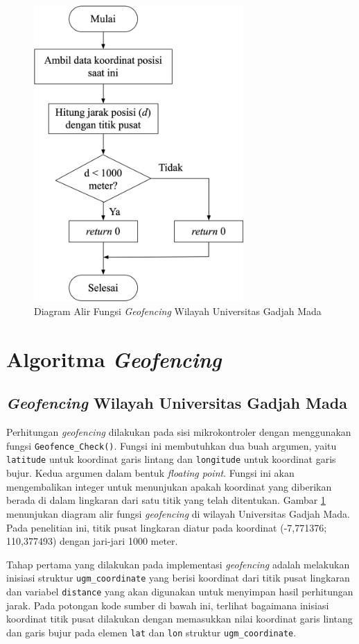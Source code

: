 \begin{figure}[H]
	\centering
	\includegraphics[width=8cm]{contents/chapter-3/flowchart-geofencing-ugm.png}
	\caption{Diagram Alir Fungsi \textit{Geofencing} Wilayah Universitas Gadjah Mada}
	\label{Fig: flowchart-geofencing-ugm}
\end{figure}

\section{Algoritma \textit{Geofencing}}
\subsection{\textit{Geofencing} Wilayah Universitas Gadjah Mada}
Perhitungan \textit{geofencing} dilakukan pada sisi mikrokontroler dengan menggunakan fungsi \texttt{Geofence\_Check()}. Fungsi ini membutuhkan dua buah argumen, yaitu \texttt{latitude} untuk koordinat garis lintang dan \texttt{longitude} untuk koordinat garis bujur. Kedua argumen dalam bentuk \textit{floating point}. Fungsi ini akan mengembalikan integer untuk menunjukan apakah koordinat yang diberikan berada di dalam lingkaran dari satu titik yang telah ditentukan. Gambar \ref{Fig: flowchart-geofencing-ugm} menunjukan diagram alir fungsi \textit{geofencing} di  wilayah Universitas Gadjah Mada. Pada penelitian ini, titik pusat lingkaran diatur pada koordinat (-7,771376; 110,377493) dengan jari-jari 1000 meter.

Tahap pertama yang dilakukan pada implementasi \textit{geofencing} adalah melakukan inisiasi struktur \texttt{ugm\_coordinate} yang berisi koordinat dari titik pusat lingkaran dan variabel \texttt{distance} yang akan digunakan untuk menyimpan hasil perhitungan jarak. Pada potongan kode sumber di bawah ini, terlihat bagaimana inisiasi koordinat titik pusat dilakukan dengan memasukkan nilai koordinat garis lintang dan garis bujur pada elemen \texttt{lat} dan \texttt{lon} struktur \texttt{ugm\_coordinate}.

